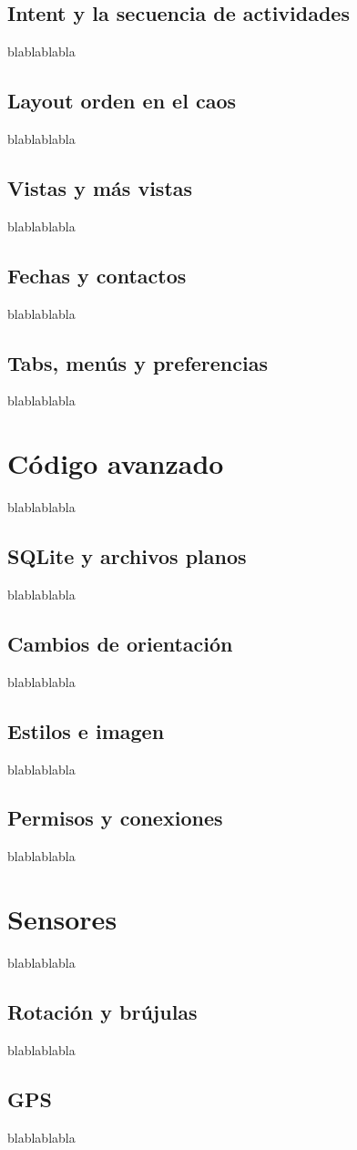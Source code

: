 \documentclass[11pt]{book}
\begin{document}
\section{Intent y la secuencia de actividades}
blablablabla
\section{Layout orden en el caos}
blablablabla
\section{Vistas y más vistas}
blablablabla
\section{Fechas y contactos}
blablablabla
\section{Tabs, menús y preferencias}
blablablabla

\chapter{Código avanzado}              
blablablabla
\section{SQLite y archivos planos}
blablablabla
\section{Cambios de orientación}
blablablabla
\section{Estilos e imagen}
blablablabla
\section{Permisos y conexiones}
blablablabla

\chapter{Sensores}
blablablabla              
\section{Rotación y brújulas}
blablablabla
\section{GPS}
blablablabla
\end{document}
